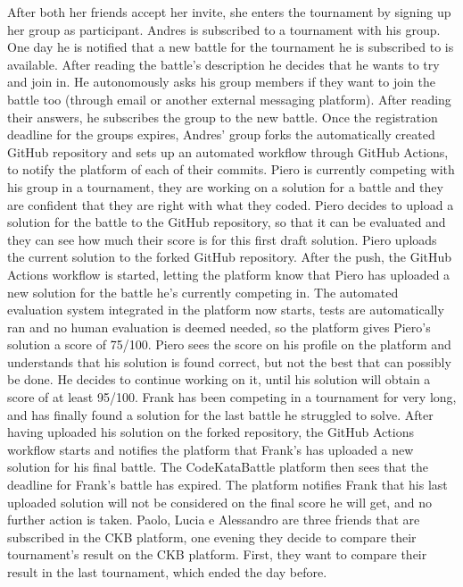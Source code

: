 \documentclass{article}
\newcounter{subsubsubsection}[subsubsection]
\begin{document}
{After both her friends accept her invite, she enters the tournament by signing up her group as participant.
Andres is subscribed to a tournament with his group. One day he is notified that a new battle for the tournament he is subscribed to is available.
After reading the battle's description he decides that he wants to try and join in. He autonomously asks his group members if they want to join the battle too (through email or another external messaging platform).
After reading their answers, he subscribes the group to the new battle.
Once the registration deadline for the groups expires, Andres' group forks the automatically created GitHub repository and sets up an automated workflow through GitHub Actions, to notify the platform of each of their commits.
Piero is currently competing with his group in a tournament, they are working on a solution for a battle and they are confident that they are right with what they coded. Piero decides to upload a solution for the battle to the GitHub repository, so that it can be evaluated and they can see how much their score is for this first draft solution.
Piero uploads the current solution to the forked GitHub repository. After the push, the GitHub Actions workflow is started, letting the platform know that Piero has uploaded a new solution for the battle he's currently competing in.
The automated evaluation system integrated in the platform now starts, tests are automatically ran and no human evaluation is deemed needed, so the platform gives Piero's solution a score of 75/100.
Piero sees the score on his profile on the platform and understands that his solution is found correct, but not the best that can possibly be done. He decides to continue working on it, until his solution will obtain a score of at least 95/100.
Frank has been competing in a tournament for very long, and has finally found a solution for the last battle he struggled to solve. After having uploaded his solution on the forked repository, the GitHub Actions workflow starts and notifies the platform that Frank's has uploaded a new solution for his final battle.
The CodeKataBattle platform then sees that the deadline for Frank's battle has expired. The platform notifies Frank that his last uploaded solution will not be considered on the final score he will get, and no further action is taken.
Paolo, Lucia e Alessandro are three friends that are subscribed in the CKB platform, one evening they decide to compare their tournament's result on the CKB platform. First, they want to compare their result in the last tournament, which ended the day before.
}
\end{document}
